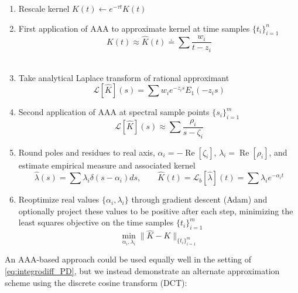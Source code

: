 \documentclass{cams-l} %
\newcommand{\cL}{\mathcal L}
\newcommand{\op}{\operatorname}
\renewcommand{\Re}{\op{Re}}
\theoremstyle{definition}
\theoremstyle{remark}
\numberwithin{equation}{section}
\begin{document}
\begin{algorithm}[H]
\DontPrintSemicolon
{}
\begin{enumerate}
\item Rescale kernel $K(t) \leftarrow e^{-\tau t}K(t)$
\item First application of AAA to approximate kernel at time samples $\{t_i\}_{i=1}^n$
$$K(t) \approx \widehat{K}(t) \doteq \sum\frac{w_i}{t - z_i}$$\\
\item Take analytical Laplace transform of rational approximant
$$\cL[\widehat{K}](s) = \sum w_ie^{-z_is}E_1(-z_is)$$
\item Second application of AAA at spectral sample points $\{s_i\}_{i=1}^m$
$$\cL[\widehat{K}](s) \approx \sum \frac{\rho_i}{s - \zeta_i}$$
\item Round poles and residues to real axis, $\alpha_i = -\Re[\zeta_i]$, $\lambda_i = \Re[\rho_i]$, and estimate empirical measure and associated kernel
$$\widehat{\lambda}(s) = \sum \lambda_i\delta(s - \alpha_i)ds, \qquad \widehat{K}(t) = \cL_b[\widehat{\lambda}](t) = \sum \lambda_ie^{-\alpha_i t}$$
\item Reoptimize real values $\{\alpha_i, \lambda_i\}$ through gradient descent (Adam) and optionally project these values to be positive after each step, minimizing the least squares objective on the time samples $\{t_i\}_{i=1}^m$
$$\min_{\alpha_i, \lambda_i}\|\widehat{K} - K\|_{\{t_i\}_{i=1}^m}$$
\end{enumerate}
\caption{AAA-Based Inverse Laplace Transform of gCM Kernels}
\label{alg:aaa_laplace}
\end{algorithm}

\bigskip

An AAA-based approach could be used equally well in the setting of \ref{eq:integrodiff_PD}, but we instead demonstrate an alternate approximation scheme using the discrete cosine transform (DCT):

\vspace{5pt}
\end{document}
